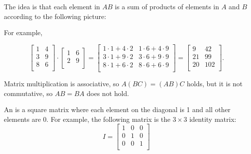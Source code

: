 The idea is that each element in $AB$
is a sum of products of elements in $A$ and $B$
according to the following picture:

\begin{center}
\end{center}

For example,

\[
 \begin{bmatrix}
  1 & 4 \\
  3 & 9 \\
  8 & 6 \\
 \end{bmatrix}
\cdot
 \begin{bmatrix}
  1 & 6 \\
  2 & 9 \\
 \end{bmatrix}
=
 \begin{bmatrix}
  1 \cdot 1 + 4 \cdot 2 & 1 \cdot 6 + 4 \cdot 9 \\
  3 \cdot 1 + 9 \cdot 2 & 3 \cdot 6 + 9 \cdot 9 \\
  8 \cdot 1 + 6 \cdot 2 & 8 \cdot 6 + 6 \cdot 9 \\
 \end{bmatrix}
=
 \begin{bmatrix}
  9 & 42 \\
  21 & 99 \\
  20 & 102 \\
 \end{bmatrix}.
\]

Matrix multiplication is associative,
so $A(BC)=(AB)C$ holds,
but it is not commutative,
so $AB = BA$ does not hold.


An  is a square matrix
where each element on the diagonal is 1
and all other elements are 0.
For example, the following matrix
is the $3 \times 3$ identity matrix:
\[
 I = \begin{bmatrix}
  1 & 0 & 0 \\
  0 & 1 & 0 \\
  0 & 0 & 1 \\
 \end{bmatrix}
\]

